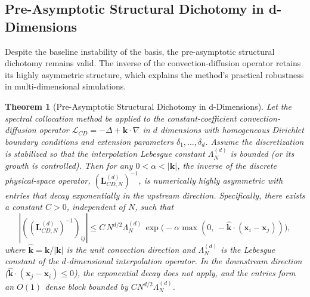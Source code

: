 \documentclass[pdflatex,sn-mathphys-num]{sn-jnl}%
\theoremstyle{thmstyleone}%
\newtheorem{theorem}{Theorem}
\newcommand{\mat}[1]{\mathbf{#1}}
\begin{document}
\subsection{Pre-Asymptotic Structural Dichotomy in d-Dimensions}

Despite the baseline instability of the basis, the pre-asymptotic structural dichotomy remains valid. The inverse of the convection-diffusion operator retains its highly asymmetric structure, which explains the method's practical robustness in multi-dimensional simulations.

\begin{theorem}[Pre-Asymptotic Structural Dichotomy in d-Dimensions]
\label{thm:d-dim-dichotomy}
Let the spectral collocation method be applied to the constant-coefficient convection-diffusion operator $\mathcal{L}_{CD} = -\Delta + \mathbf{k} \cdot \nabla$ in $d$ dimensions with homogeneous Dirichlet boundary conditions and extension parameters $\delta_1, \dots, \delta_d$. Assume the discretization is stabilized so that the interpolation Lebesgue constant $\Lambda_N^{(d)}$ is bounded (or its growth is controlled). Then for any $0 < \alpha < |\mathbf{k}|$, the inverse of the discrete physical-space operator, $(\mat{L}_{CD,N}^{(d)})^{-1}$, is numerically highly asymmetric with entries that decay exponentially in the upstream direction. Specifically, there exists a constant $C > 0$, independent of $N$, such that
\begin{equation}|((\mat{L}_{CD,N}^{(d)})^{-1})_{ij}| \le C\, N^{d/2} \Lambda_N^{(d)}\, \exp\bigl(-\alpha \max(0,\, -\hat{\mathbf{k}} \cdot (\mathbf{x}_i - \mathbf{x}_j))\bigr),\end{equation}
where $\hat{\mathbf{k}} = \mathbf{k}/|\mathbf{k}|$ is the unit convection direction and $\Lambda_N^{(d)}$ is the Lebesgue constant of the $d$-dimensional interpolation operator. In the downstream direction ($\hat{\mathbf{k}} \cdot (\mathbf{x}_j - \mathbf{x}_i) \le 0$), the exponential decay does not apply, and the entries form an $O(1)$ dense block bounded by $C N^{d/2} \Lambda_N^{(d)}$.
\end{theorem}
\end{document}
